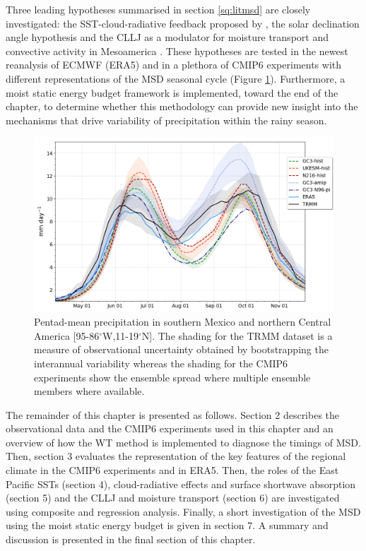 Three leading hypotheses summarised in section \ref{sq:litmsd} are closely investigated: 
the SST-cloud-radiative feedback proposed by \cite{magana1999}, the solar declination angle hypothesis \citep{karnauskas2013} and the CLLJ as a modulator for moisture transport and convective activity in Mesoamerica \citep{herrera2015,zermeno2019}. 
These hypotheses are tested in the newest reanalysis of ECMWF (ERA5) and in a plethora of CMIP6 experiments with different representations of the MSD seasonal cycle (Figure \ref{fig:msdcaribb}). 
Furthermore, a moist static energy budget framework is implemented, toward the end of the chapter, to determine whether this methodology can provide new insight into the mechanisms that drive variability of precipitation within the rainy season. 
 
 \begin{figure}[t!]
\includegraphics[width=\linewidth]{figures/seasonal_cycle_p3.png}
\caption[Seasonal cycle of precipitation in Mesoamerica]{Pentad-mean precipitation in southern Mexico and northern Central America [95-86$^\circ$W,11-19$^\circ$N]. The shading for the TRMM dataset is a measure of observational uncertainty obtained by bootstrapping the interannual variability whereas the shading for the CMIP6 experiments show the ensemble spread where multiple ensemble members where available. }
\label{fig:msdcaribb}
\end{figure} 
 

 
The remainder of this chapter is presented as follows. Section 2 describes the observational data and the CMIP6 experiments used in this chapter and an overview of how the WT method is implemented to diagnose the timings of MSD. Then, section 3 evaluates the representation of the key features of the regional climate in the CMIP6 experiments and in ERA5.
Then, the roles of the East Pacific SSTs (section 4), cloud-radiative effects and surface shortwave absorption (section 5) and the CLLJ and moisture transport (section 6) are investigated using composite and regression analysis. Finally, a short investigation of the MSD using the moist static energy budget is given in section 7. A summary and discussion is presented in the final section of this chapter. 
  
